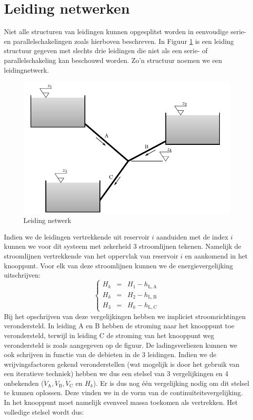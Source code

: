 	\section{Leiding netwerken}
	\label{sec:Leiding netwerken}	
Niet alle structuren van leidingen kunnen opgesplitst worden in eenvoudige serie- en parallelschakelingen zoals hierboven beschreven. In Figuur \ref{fig:leidingnetwerk} is een leiding structuur gegeven met slechts drie leidingen die niet als een serie- of parallelschakeling kan beschouwd worden. Zo'n structuur noemen we een leidingnetwerk.
\begin{figure}
	\centering
	\includegraphics{fig/leidingstelsels/Leidingnetwerk}
	\caption{Leiding netwerk}
	\label{fig:leidingnetwerk}
\end{figure}
Indien we de leidingen vertrekkende uit reservoir $i$ aanduiden met de index $i$ kunnen we voor dit systeem met zekerheid 3 stroomlijnen tekenen. Namelijk de stroomlijnen vertrekkende van het oppervlak van reservoir $i$ en aankomend in het knooppunt. Voor elk van deze stroomlijnen kunnen we de energievergelijking uitschrijven:
\begin{equation}
	\left\{
	\begin{array}{lcl}
		H_k &=& H_1 - h_{\mathrm{L},\mathrm{A}} \nonumber \\
		H_k &=& H_2 - h_{\mathrm{L},\mathrm{B}} \\
		H_3 &=& H_k - h_{\mathrm{L},\mathrm{C}} \nonumber
	\end{array}
	\right.
\end{equation} 
Bij het opschrijven van deze vergelijkingen hebben we impliciet stroomrichtingen verondersteld. In leiding A en B hebben de stroming naar het knooppunt toe verondersteld, terwijl in leiding C de stroming van het knooppunt weg verondersteld is zoals aangegeven op de figuur. De ladingsverliezen kunnen we ook schrijven in functie van de debieten in de 3 leidingen. Indien we de wrijvingsfactoren gekend veronderstellen (wat mogelijk is door het gebruik van een iteratieve techniek) hebben we dus een stelsel van 3 vergelijkingen en 4 onbekenden ($\dot{V}_\mathrm{A},\dot{V}_\mathrm{B},\dot{V}_\mathrm{C}$ en $H_k$). Er is dus nog één vergelijking nodig om dit stelsel te kunnen oplossen. Deze vinden we in de vorm van de continuïteitsvergelijking. In het knooppunt moet namelijk evenveel massa toekomen als vertrekken. Het volledige stelsel wordt dus:
